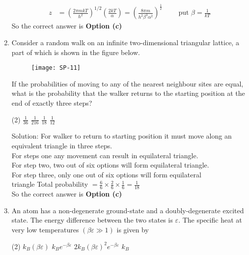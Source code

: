 \begin{enumerate}
\begin{answer}
\begin{align*}
	z&=\left(\frac{2 \pi m k T}{h^{2}}\right)^{1 / 2}\left(\frac{2 k T}{\alpha}\right)=\left(\frac{8 \pi m}{h^{2} \beta^{3} \alpha^{2}}\right)^{\frac{1}{2}}\qquad
\text{	put }\beta=\frac{1}{k T}
	\end{align*}
		So the correct answer is \textbf{Option (c)}
\end{answer}
\item Consider a random walk on an infinite two-dimensional triangular lattice, a part of which is shown in the figure below.
\begin{figure}[H]
	\centering
	\texttt{[image: SP-11]}
\end{figure}
If the probabilities of moving to any of the nearest neighbour sites are equal, what is the probability that the walker returns to the starting position at the end of exactly three steps?
{	}
 \begin{tasks}(2)
	\task[\textbf{a.}]$\frac{1}{36}$
	\task[\textbf{b.}]$\frac{1}{216}$
	\task[\textbf{c.}] $\frac{1}{18}$
	\task[\textbf{d.}] $\frac{1}{12}$
\end{tasks}
\begin{answer}
Solution: For walker to return to starting position it must move along an equivalent triangle in three steps.\\
For steps one any movement can result in equilateral triangle.\\
For step two, two out of six options will form equilateral triangle.\\
For step three, only one out of six options will form equilateral\\ triangle Total probability $=\frac{6}{6} \times \frac{2}{6} \times \frac{1}{6}=\frac{1}{18}$\\
	So the correct answer is \textbf{Option (c)}
\end{answer}
\item 	An atom has a non-degenerate ground-state and a doubly-degenerate excited state. The energy difference between the two states is $\varepsilon$. The specific heat at very low temperatures $(\beta \varepsilon \gg 1)$ is given by
{	}
	 \begin{tasks}(2)
		\task[\textbf{a.}]$k_{B}(\beta \varepsilon)$
		\task[\textbf{b.}]$k_{B} e^{-\beta \varepsilon}$
		\task[\textbf{c.}] $2 k_{B}(\beta \varepsilon)^{2} e^{-\beta \varepsilon}$
		\task[\textbf{d.}]  $k_{B}$
	\end{tasks}
\begin{answer}
	\begin{align*}

\end{align*}
\end{answer}
\end{enumerate}
